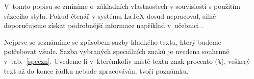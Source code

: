 \documentclass[twoside,12pt]{article}%
\begin{document}
V~tomto popisu se zmíníme o~základních vlastnostech v souvislosti s použitím
sázecího stylu. Pokud čtenář v systému \LaTeX{} dosud nepracoval, silně
doporučujeme získat podrobnější informace například v~učebnici \cite{latzac}.

\def\bsl{\char92}
\def\lsv{\char123}
\def\rsv{\char125}


Nejprve se seznámíme se způsobem sazby hladkého textu, který budeme potřebovat
všude. Sazba vybraných speciálních znaků je uvedena souhrnně v~tab.~\ref{speczn}.
Uvedeme-li v~kterémkoliv místě textu znak procento (\texttt{\%}), veškerý text
až do konce řádku nebude zpracováván, tvoří poznámku.

\end{document}
